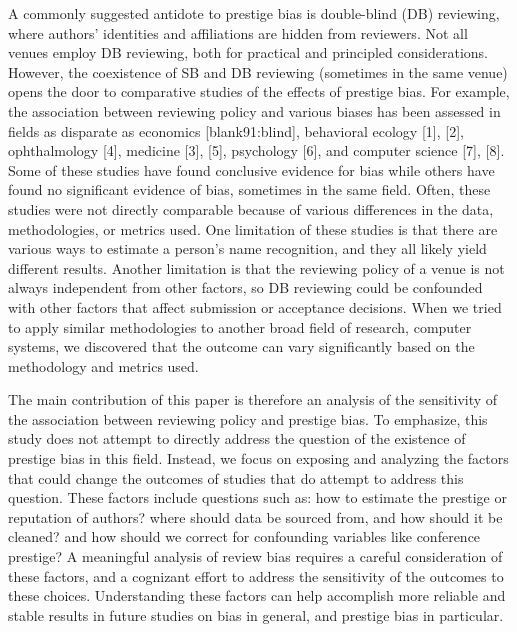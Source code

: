 \documentclass[12pt]{article}
\begin{document}
A commonly suggested antidote to prestige bias is double-blind (DB) reviewing, where authors' identities and affiliations are hidden from reviewers.
Not all venues employ DB reviewing, both for practical and principled considerations.
However, the coexistence of SB and DB reviewing (sometimes in the same venue) opens the door to comparative studies of the effects of prestige bias.
For example, the association between reviewing policy and various biases has been assessed in fields as disparate as economics {[}blank91:blind{]}, behavioral ecology {[}1{]}, {[}2{]}, ophthalmology {[}4{]}, medicine {[}3{]}, {[}5{]}, psychology {[}6{]}, and computer science {[}7{]}, {[}8{]}.
Some of these studies have found conclusive evidence for bias while others have found no significant evidence of bias, sometimes in the same field.
Often, these studies were not directly comparable because of various differences in the data, methodologies, or metrics used.
One limitation of these studies is that there are various ways to estimate a person's name recognition, and they all likely yield different results.
Another limitation is that the reviewing policy of a venue is not always independent from other factors, so DB reviewing could be confounded with other factors that affect submission or acceptance decisions.
When we tried to apply similar methodologies to another broad field of research, computer systems, we discovered that the outcome can vary significantly based on the methodology and metrics used.

The main contribution of this paper is therefore an analysis of the sensitivity of the association between reviewing policy and prestige bias.
To emphasize, this study does not attempt to directly address the question of the existence of prestige bias in this field.
Instead, we focus on exposing and analyzing the factors that could change the outcomes of studies that do attempt to address this question.
These factors include questions such as: how to estimate the prestige or reputation of authors? where should data be sourced from, and how should it be cleaned? and how should we correct for confounding variables like conference prestige?
A meaningful analysis of review bias requires a careful consideration of these factors, and a cognizant effort to address the sensitivity of the outcomes to these choices.
Understanding these factors can help accomplish more reliable and stable results in future studies on bias in general, and prestige bias in particular.
\end{document}
